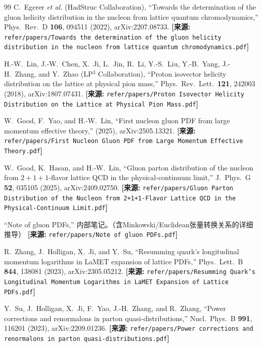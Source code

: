 \documentclass[12pt,a4paper]{ctexart}
\theoremstyle{definition}
\begin{document}
\begin{thebibliography}{99}
C.~Egerer \textit{et al.} (HadStruc Collaboration),
``Towards the determination of the gluon helicity distribution in the nucleon from lattice quantum chromodynamics,''
Phys.\ Rev.\ D \textbf{106}, 094511 (2022), arXiv:2207.08733.
\quad\textbf{[来源:} \texttt{refer/papers/Towards the determination of the gluon helicity distribution in the nucleon from lattice quantum chromodynamics.pdf}\textbf{]}

H.-W.~Lin, J.-W.~Chen, X.~Ji, L.~Jin, R.~Li, Y.-S.~Liu, Y.-B.~Yang, J.-H.~Zhang, and Y.~Zhao (LP$^3$ Collaboration),
``Proton isovector helicity distribution on the lattice at physical pion mass,''
Phys.\ Rev.\ Lett.\ \textbf{121}, 242003 (2018), arXiv:1807.07431.
\quad\textbf{[来源:} \texttt{refer/papers/Proton Isovector Helicity Distribution on the Lattice at Physical Pion Mass.pdf}\textbf{]}

W.~Good, F.~Yao, and H.-W.~Lin,
``First nucleon gluon PDF from large momentum effective theory,''
(2025), arXiv:2505.13321.
\quad\textbf{[来源:} \texttt{refer/papers/First Nucleon Gluon PDF from Large Momentum Effective Theory.pdf}\textbf{]}

W.~Good, K.~Hasan, and H.-W.~Lin,
``Gluon parton distribution of the nucleon from $2+1+1$-flavor lattice QCD in the physical-continuum limit,''
J.\ Phys.\ G \textbf{52}, 035105 (2025), arXiv:2409.02750.
\quad\textbf{[来源:} \texttt{refer/papers/Gluon Parton Distribution of the Nucleon from 2+1+1-Flavor Lattice QCD in the Physical-Continuum Limit.pdf}\textbf{]}

``Note of gluon PDFs,''
内部笔记。（含Minkowski/Euclidean张量转换关系的详细推导）
\quad\textbf{[来源:} \texttt{refer/papers/Note of gluon PDFs.pdf}\textbf{]}


R.~Zhang, J.~Holligan, X.~Ji, and Y.~Su,
``Resumming quark's longitudinal momentum logarithms in LaMET expansion of lattice PDFs,''
Phys.\ Lett.\ B \textbf{844}, 138081 (2023), arXiv:2305.05212.
\quad\textbf{[来源:} \texttt{refer/papers/Resumming Quark's Longitudinal Momentum Logarithms in LaMET Expansion of Lattice PDFs.pdf}\textbf{]}

Y.~Su, J.~Holligan, X.~Ji, F.~Yao, J.-H.~Zhang, and R.~Zhang,
``Power corrections and renormalons in parton quasi-distributions,''
Nucl.\ Phys.\ B \textbf{991}, 116201 (2023), arXiv:2209.01236.
\quad\textbf{[来源:} \texttt{refer/papers/Power corrections and renormalons in parton quasi-distributions.pdf}\textbf{]}


\end{thebibliography}
\end{document}
